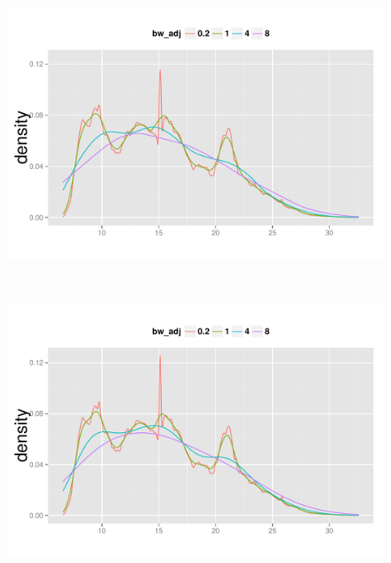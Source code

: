 \begin{figure}
\begin{minipage}[t]{0.33\textwidth}
  \end{minipage}
  \begin{minipage}[t]{0.34\textwidth}
    \centering
    \includegraphics[width=\textwidth,height=\textwidth]{fig/Temperature_epanechnikov.pdf}
  \end{minipage}\\
    \begin{minipage}[t]{0.33\textwidth}
    \centering
    \includegraphics[width=\textwidth,height=\textwidth]{fig/Temperature_Gaussian.pdf}

\end{minipage}
\end{figure}
